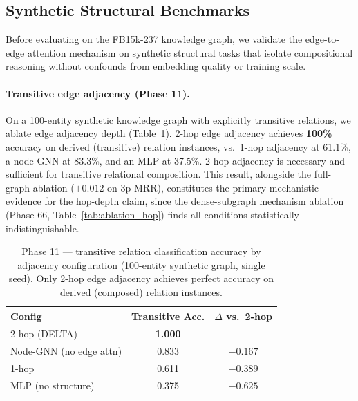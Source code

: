 \documentclass{article}
\begin{document}
\subsection{Synthetic Structural Benchmarks}
\label{sec:exp_synthetic}

Before evaluating on the FB15k-237 knowledge graph, we validate the edge-to-edge attention mechanism on synthetic structural tasks that isolate compositional reasoning without confounds from embedding quality or training scale.

\paragraph{Transitive edge adjacency (Phase 11).}
On a 100-entity synthetic knowledge graph with explicitly transitive relations, we ablate edge adjacency depth (Table~\ref{tab:phase11}). 2-hop edge adjacency achieves \textbf{100\%} accuracy on derived (transitive) relation instances, vs.\ 1-hop adjacency at 61.1\%, a node GNN at 83.3\%, and an MLP at 37.5\%. 2-hop adjacency is necessary and sufficient for transitive relational composition. This result, alongside the full-graph ablation ($+0.012$ on 3p MRR), constitutes the primary mechanistic evidence for the hop-depth claim, since the dense-subgraph mechanism ablation (Phase 66, Table~\ref{tab:ablation_hop}) finds all conditions statistically indistinguishable.

\begin{table}[t]
\centering
\caption{Phase 11 --- transitive relation classification accuracy by adjacency configuration (100-entity synthetic graph, single seed). Only 2-hop edge adjacency achieves perfect accuracy on derived (composed) relation instances.}
\label{tab:phase11}
\begin{tabular}{@{}lcc@{}}
\toprule
\textbf{Config} & \textbf{Transitive Acc.} & \textbf{$\Delta$ vs.\ 2-hop} \\
\midrule
2-hop (DELTA) & \textbf{1.000} & --- \\
Node-GNN (no edge attn) & 0.833 & $-0.167$ \\
1-hop & 0.611 & $-0.389$ \\
MLP (no structure) & 0.375 & $-0.625$ \\
\bottomrule
\end{tabular}
\end{table}
\end{document}

